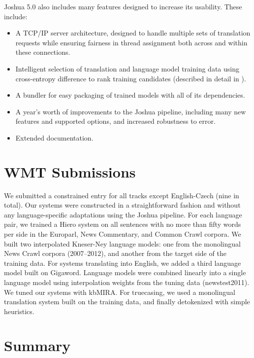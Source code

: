 \documentclass[11pt]{article}
\begin{document}
Joshua 5.0 also includes many features designed to increase its
usability.  These include:

\begin{itemize}
\item A TCP/IP server architecture, designed to handle multiple sets
  of translation requests while ensuring fairness in thread assignment
  both across and within these connections.
\item Intelligent selection of translation and language model training
  data using cross-entropy difference to rank training candidates
  \cite{moore2010intelligent,axelrod-he-gao:2011:EMNLP}
  (described in detail in ).
\item A bundler for easy packaging of trained models with
  all of its dependencies.
\item A year's worth of improvements to the Joshua pipeline, including many
  new features and supported options, and increased robustness to error.
\item Extended documentation.
\end{itemize}


\section{WMT Submissions}

We submitted a constrained entry for all tracks except English-Czech
(nine in total). Our systems were constructed in a straightforward
fashion and without any language-specific adaptations using the Joshua
pipeline. For each language pair, we trained a Hiero system on all
sentences with no more than fifty words per side in the Europarl, News
Commentary, and Common Crawl corpora. We built two interpolated Kneser-Ney language
models: one from the monolingual News Crawl corpora (2007--2012), and
another from the target side of the training data.  For systems
translating into English, we added a third language model built on
Gigaword. Language models were combined linearly into a single
language model using interpolation weights from the tuning data
(newstest2011).  We tuned our systems with kbMIRA. For truecasing, 
we used a monolingual translation system built on the training data,
and finally detokenized with simple heuristics.

\section{Summary}
\end{document}

